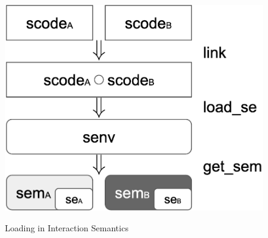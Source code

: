 \begin{figure}
\\
\includegraphics[width=0.6\linewidth]{fig-load.png}




\caption{Loading in Interaction Semantics}
\label{fig:full-sem}
\vspace*{-2mm}
\end{figure}

